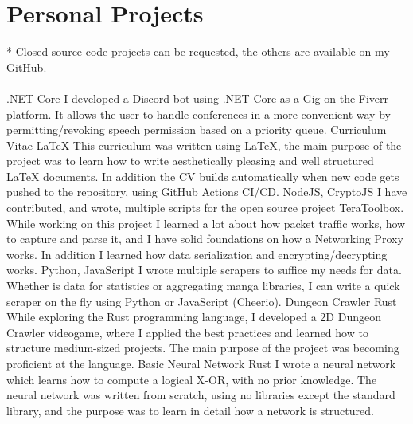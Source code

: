 \section*{Personal Projects}
{\color{violet}*}
\footnotesize
Closed source code projects can be requested, the others are available on my GitHub.\\\\
\normalsize
{}
  {.NET Core}
  {I developed a Discord bot using .NET Core as a Gig on the Fiverr platform.
   It allows the user to handle conferences in a more convenient way by permitting/revoking speech permission based on a priority queue.}
\tech
  {Curriculum Vitae}
  {LaTeX}
  {This curriculum was written using LaTeX, the main purpose of the project was to learn how to write aesthetically pleasing and well structured LaTeX documents. In addition the CV builds automatically when new code gets pushed to the repository, using GitHub Actions CI/CD.}
  {NodeJS, CryptoJS}
  {I have contributed, and wrote, multiple scripts for the open source project TeraToolbox. While working on this project I learned a lot about how packet traffic works, how to capture and parse it, and I have solid foundations on how a Networking Proxy works. In addition I learned how data serialization and encrypting/decrypting works.}
  {Python, JavaScript}
  {I wrote multiple scrapers to suffice my needs for data. Whether is data for statistics or aggregating manga libraries, I can write a quick scraper on the fly using Python or JavaScript (Cheerio).}
\tech
  {Dungeon Crawler}
  {Rust}
  {While exploring the Rust programming language, I developed a 2D Dungeon Crawler videogame, where I applied the best practices and learned how to structure medium-sized projects. The main purpose of the project was becoming proficient at the language.}
\tech
  {Basic Neural Network}
  {Rust}
  {I wrote a neural network which learns how to compute a logical X-OR, with no prior knowledge. The neural network was written from scratch, using no libraries except the standard library, and the purpose was to learn in detail how a network is structured.}
